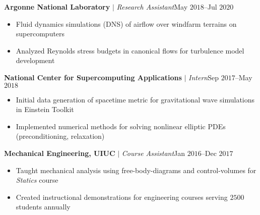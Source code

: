 \documentclass[10pt]{article}
\begin{document}
\begin{multicols}{2}
\vspace{0.5em}
%
\textbf{Argonne National Laboratory} $|$ \textit{Research Assistant}\hfill May $2018$--Jul $2020$

\vspace{-1.75em}
\begin{itemize}[label=-,leftmargin=1.0em]
    \setlength\itemsep{-0.25em}
    \item Fluid dynamics simulations (DNS) of airflow over windfarm terrains on supercomputers
    \item Analyzed Reynolds stress budgets in canonical flows for turbulence model development
\end{itemize}
\vspace{-2.0em}

\vspace{0.5em}
%
\textbf{National Center for Supercomputing Applications} $|$ \textit{Intern}\hfill Sep $2017$--May $2018$

\vspace{-1.75em}
\begin{itemize}[label=-,leftmargin=1.0em]
    \setlength\itemsep{-0.25em}
    \item Initial data generation of spacetime metric for gravitational wave simulations in Einstein Toolkit
    \item Implemented numerical methods for solving nonlinear elliptic PDEs (preconditioning, relaxation)
\end{itemize}
\vspace{-2.0em}

\vspace{0.5em}
%
\textbf{Mechanical Engineering, UIUC} $|$ \textit{Course Assistant}\hfill Jan $2016$--Dec $2017$

\vspace{-1.75em}
\begin{itemize}[label=-,leftmargin=1.0em]
    \setlength\itemsep{-0.25em}
    \item Taught mechanical analysis using free-body-diagrams and control-volumes for \textit{Statics} course
    \item Created instructional demonstrations for engineering courses serving $2500$ students annually
\end{itemize}
\vspace{-2.0em}

\end{multicols}
\end{document}
